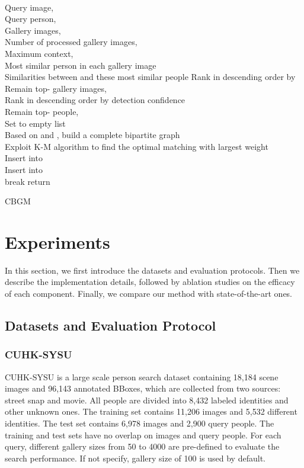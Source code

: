 \documentclass[letterpaper]{article} \usepackage{aaai21}  \usepackage{times}  \usepackage{helvet} \usepackage{courier}  \usepackage[hyphens]{url}  \usepackage{graphicx} \urlstyle{rm} \def\UrlFont{\rm}  \usepackage{natbib}  \usepackage{caption} \usepackage{multirow}
\begin{document}
\begin{algorithm}[t]
    \DontPrintSemicolon
      \KwInput
      {
          ~~\\
          Query image, \\
          Query person, \\
          Gallery images, \\
          Number of processed gallery images, \\
          Maximum context, 
      }
      \KwOutput
      {
          ~~\\
          Most similar person in each gallery image\\
          Similarities between  and these most similar people
      }
      Rank  in descending order by \\
      Remain top- gallery images, \\
      Rank  in descending order by detection confidence\\
      Remain top- people, \\
      Set  to empty list\\
      {
          Based on  and , build a complete bipartite graph \\
          Exploit K-M algorithm to find the optimal matching  with largest weight\\
          {
              \If{}
              {
                  Insert  into \\
                  Insert  into \\
                  break
              }
          }
      }
      return 
    \caption{CBGM}
    \label{CBGM}
\end{algorithm}



\section{Experiments}
In this section, we first introduce the datasets and evaluation protocols. Then we describe the implementation details, followed by ablation studies on the efficacy of each component. Finally, we compare our method with state-of-the-art ones.

\subsection{Datasets and Evaluation Protocol}
\subsubsection{CUHK-SYSU}
CUHK-SYSU \cite{oim} is a large scale person search dataset containing 18,184 scene images and 96,143 annotated BBoxes, which are collected from two sources: street snap and movie. All people are divided into 8,432 labeled identities and other unknown ones. The training set contains 11,206 images and 5,532 different identities. The test set contains 6,978 images and 2,900 query people. The training and test sets have no overlap on images and query people. For each query, different gallery sizes from 50 to 4000 are pre-defined to evaluate the search performance. If not specify, gallery size of 100 is used by default.
\end{document}
